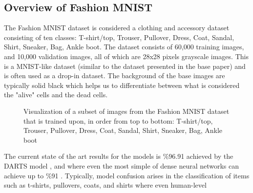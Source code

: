 \documentclass[conference]{IEEEtran}
\begin{document}
\subsection{Overview of Fashion MNIST}

The Fashion MNIST dataset is considered a clothing and accessory dataset consisting of ten classes: T-shirt/top, Trouser, Pullover, Dress, Coat, Sandal, Shirt, Sneaker, Bag, Ankle boot. The dataset consists of 60,000 training images, and 10,000 validation images, all of which are 28x28 pixels grayscale images. This is a MNIST-like dataset (similar to the dataset presented in the base paper) and is often used as a drop-in dataset. The background of the base images are typically solid black which helps us to differentiate between what is considered the "alive" cells and the dead cells. 

\begin{figure}[htbp]
\caption{ Visualization of a subset of images from the Fashion MNIST dataset that is trained upon, in order from top to bottom: T-shirt/top, Trouser, Pullover, Dress, Coat, Sandal, Shirt, Sneaker, Bag, Ankle boot } 
\end{figure}

The current state of the art results for the models is \%96.91 achieved by the DARTS model \cite{Darts}, and where even the most simple of dense neural networks can achieve up to \%91 \cite{tf_fmnist}. Typically, model confusion arises in the classification of items such as t-shirts, pullovers, coats, and shirts where even human-level
\end{document}
